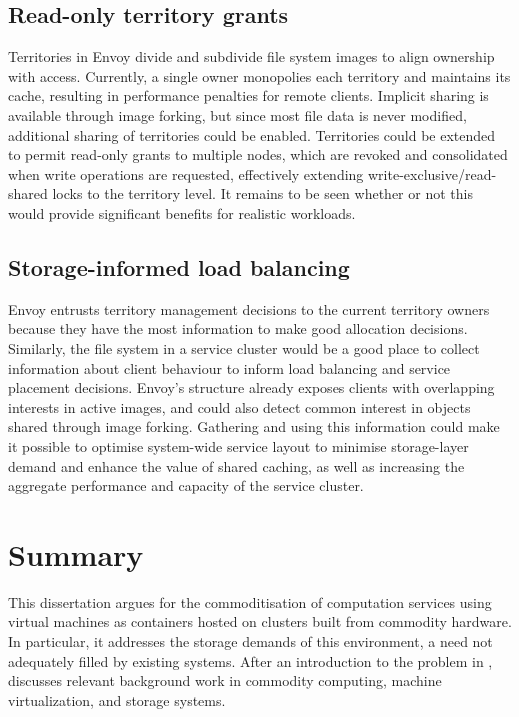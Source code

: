 \subsection{Read-only territory grants}

Territories in Envoy divide and subdivide file system images to align ownership with access. Currently, a single owner monopolies each territory and maintains its cache, resulting in performance penalties for remote clients. Implicit sharing is available through image forking, but since most file data is never modified, additional sharing of territories could be enabled. Territories could be extended to permit read-only grants to multiple nodes, which are revoked and consolidated when write operations are requested, effectively extending write-exclusive/read-shared locks to the territory level. It remains to be seen whether or not this would provide significant benefits for realistic workloads.

\subsection{Storage-informed load balancing}

Envoy entrusts territory management decisions to the current territory owners because they have the most information to make good allocation decisions. Similarly, the file system in a service cluster would be a good place to collect information about client behaviour to inform load balancing and service placement decisions. Envoy's structure already exposes clients with overlapping interests in active images, and could also detect common interest in objects shared through image forking. Gathering and using this information could make it possible to optimise system-wide service layout to minimise storage-layer demand and enhance the value of shared caching, as well as increasing the aggregate performance and capacity of the service cluster.

\section{Summary}

This dissertation argues for the commoditisation of computation services using virtual machines as containers hosted on clusters built from commodity hardware. In particular, it addresses the storage demands of this environment, a need not adequately filled by existing systems. After an introduction to the problem in ,  discusses relevant background work in commodity computing, machine virtualization, and storage systems.

